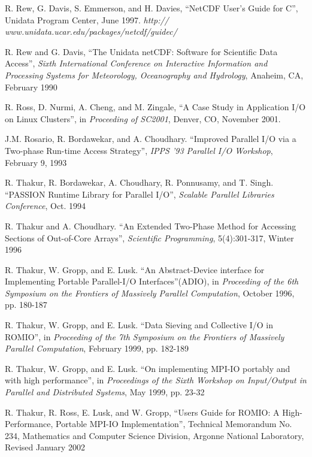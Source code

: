 \documentclass[10pt,twocolumn]{article}          %
\begin{document}
\begin{thebibliography}{99}
R. Rew, G. Davis, S. Emmerson, and H. Davies, ``NetCDF User's Guide for C'', Unidata Program
Center, June 1997. {\em http:// www.unidata.ucar.edu/packages/netcdf/guidec/}

R. Rew and G. Davis, ``The Unidata netCDF: Software for Scientific
Data Access'', {\em Sixth International Conference on Interactive
Information and Processing Systems for Meteorology, Oceanography
and Hydrology}, Anaheim, CA, February 1990

R. Ross, D. Nurmi, A. Cheng, and M. Zingale, ``A Case Study in
Application I/O on Linux Clusters'', in {\em Proceeding of
SC2001}, Denver, CO, November 2001.

J.M. Rosario, R. Bordawekar, and A. Choudhary. ``Improved Parallel
I/O via a Two-phase Run-time Access Strategy'', {\em IPPS '93
Parallel I/O Workshop}, February 9, 1993

R. Thakur, R. Bordawekar, A. Choudhary, R. Ponnusamy, and T.
Singh. ``PASSION Runtime Library for Parallel I/O'', {\em Scalable
Parallel Libraries Conference}, Oct. 1994

R. Thakur and A. Choudhary. ``An Extended Two-Phase Method for
Accessing Sections of Out-of-Core Arrays'', {\em Scientific
Programming}, 5(4):301-317, Winter 1996

R. Thakur, W. Gropp, and E. Lusk. ``An Abstract-Device interface
for Implementing Portable Parallel-I/O Interfaces''(ADIO), in {\em
Proceeding of the 6th Symposium on the Frontiers of Massively
Parallel Computation}, October 1996, pp. 180-187

R. Thakur, W. Gropp, and E. Lusk. ``Data Sieving and Collective
I/O in ROMIO'', in {\em Proceeding of the 7th Symposium on the
Frontiers of Massively Parallel Computation}, February 1999, pp.
182-189

R. Thakur, W. Gropp, and E. Lusk. ``On implementing MPI-IO portably and with high performance'', in
{\em Proceedings of the Sixth Workshop on Input/Output in Parallel and Distributed Systems}, May
1999, pp. 23-32

R. Thakur, R. Ross, E. Lusk, and W. Gropp, ``Users Guide for
ROMIO: A High-Performance, Portable MPI-IO Implementation'',
Technical Memorandum No. 234, Mathematics and Computer Science
Division, Argonne National Laboratory, Revised January 2002

\end{thebibliography}
\end{document}
